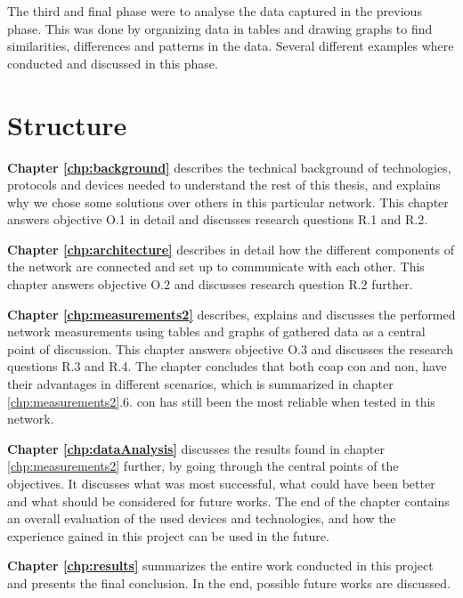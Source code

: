 The third and final phase were to analyse the data captured in the previous phase. This was done by organizing data in tables and drawing graphs to find similarities, differences and patterns in the data. Several different examples where conducted and discussed in this phase. 


\section{Structure}


\noindent \textbf{Chapter \ref{chp:background}} describes the technical background of technologies, protocols and devices needed to understand the rest of this thesis, and explains why we chose some solutions over others in this particular network. This chapter answers objective O.1 in detail and discusses research questions R.1 and R.2. 

\noindent \textbf{Chapter \ref{chp:architecture}} describes in detail how the different components of the network are connected and set up to communicate with each other. This chapter answers objective O.2 and discusses research question R.2 further. 

\noindent \textbf{Chapter \ref{chp:measurements2}} describes, explains and discusses the performed network measurements using tables and graphs of gathered data as a central point of discussion. This chapter answers objective O.3 and discusses the research questions R.3 and R.4. The chapter concludes that both \gls{coap} \gls{con} and \gls{non}, have their advantages in different scenarios, which is summarized in chapter \ref{chp:measurements2}.6. \gls{con} has still been the most reliable when tested in this network. 

\noindent \textbf{Chapter \ref{chp:dataAnalysis}} discusses the results found in chapter \ref{chp:measurements2} further, by going through the central points of the objectives. It discusses what was most successful, what could have been better and what should be considered for future works. The end of the chapter contains an overall evaluation of the used devices and technologies, and how the experience gained in this project can be used in the future. 

\noindent \textbf{Chapter \ref{chp:results}} summarizes the entire work conducted in this project and presents the final conclusion. In the end, possible future works are discussed. 






